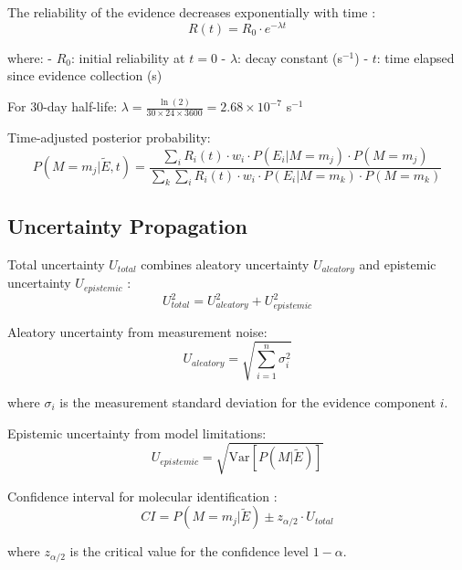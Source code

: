 \documentclass[12pt,a4paper]{article}
\begin{document}
The reliability of the evidence decreases exponentially with time \cite{norris1997markov}:
\begin{equation}
R(t) = R_0 \cdot e^{-\lambda t}
\end{equation}

where:
- $R_0$: initial reliability at $t = 0$
- $\lambda$: decay constant (s$^{-1}$)
- $t$: time elapsed since evidence collection (s)

For 30-day half-life: $\lambda = \frac{\ln(2)}{30 \times 24 \times 3600} = 2.68 \times 10^{-7}$ s$^{-1}$

Time-adjusted posterior probability:
\begin{equation}
P(M = m_j | \tilde{E}, t) = \frac{\sum_{i} R_i(t) \cdot w_i \cdot P(E_i | M = m_j) \cdot P(M = m_j)}{\sum_{k} \sum_{i} R_i(t) \cdot w_i \cdot P(E_i | M = m_k) \cdot P(M = m_k)}
\end{equation}

\subsection{Uncertainty Propagation}

Total uncertainty $U_{total}$ combines aleatory uncertainty $U_{aleatory}$ and epistemic uncertainty $U_{epistemic}$ \cite{helton2004alternative}:
\begin{equation}
U_{total}^2 = U_{aleatory}^2 + U_{epistemic}^2
\end{equation}

Aleatory uncertainty from measurement noise:
\begin{equation}
U_{aleatory} = \sqrt{\sum_{i=1}^n \sigma_i^2}
\end{equation}

where $\sigma_i$ is the measurement standard deviation for the evidence component $i$.

Epistemic uncertainty from model limitations:
\begin{equation}
U_{epistemic} = \sqrt{\text{Var}[P(M|\tilde{E})]}
\end{equation}

Confidence interval for molecular identification \cite{efron1993bootstrap}:
\begin{equation}
CI = P(M = m_j | \tilde{E}) \pm z_{\alpha/2} \cdot U_{total}
\end{equation}

where $z_{\alpha/2}$ is the critical value for the confidence level $1-\alpha$.

\end{document}
